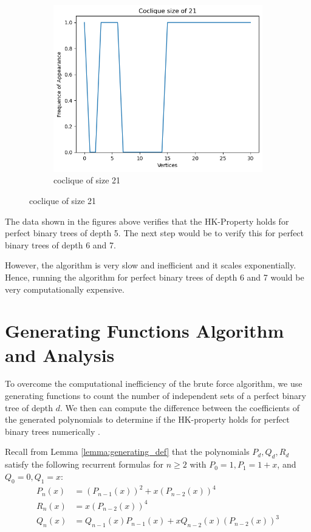 \documentclass{amsart}
\theoremstyle{definition}
\begin{document}
\begin{appendix}
\begin{figure}[hbt!]
\begin{subfigure}[b]{.45\textwidth}
			\includegraphics[width=1\linewidth]{images/depth_5_size_21.png}
			\caption{coclique of size 21}
		\end{subfigure}
	\end{figure}
	\newpage

	The data shown in the figures above verifies that the HK-Property holds for perfect binary trees of depth 5. The next step would be to verify this for perfect binary trees of depth 6 and 7.

	However, the algorithm is very slow and inefficient and it scales exponentially. Hence, running the algorithm for perfect binary trees of depth 6 and 7 would be very computationally expensive.

	\section{Generating Functions Algorithm and Analysis}\label{generating-functions-algorithm}

	To overcome the computational inefficiency of the brute force algorithm, we use generating functions to count the number of independent sets of a perfect binary tree of depth $d$. We then can compute the difference between the coefficients of the generated polynomials to determine if the HK-property holds for perfect binary trees numerically \cite{Maharjan_Exploring_Perfect_Binary}.

	Recall from Lemma \ref{lemma:generating_def} that the polynomials $P_d, Q_d, R_d$ satisfy the following recurrent formulas for $n\geq 2$ with $P_{0}=1, P_1=1+x$, and $Q_{0}=0, Q_1=x$:
	\begin{align*}
		P_n(x) & = (P_{n - 1}(x))^2 + x(P_{n - 2}(x))^4                     \\
		R_n(x) & = x(P_{n - 2}(x))^4                                        \\
		Q_n(x) & = Q_{n - 1}(x)P_{n - 1}(x) + xQ_{n - 2}(x)(P_{n - 2}(x))^3
	\end{align*}


\end{appendix}
\end{document}
